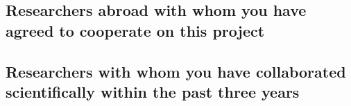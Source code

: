 \documentclass{scrartcl}
\begin{document}
\subsection{Researchers abroad with whom you have agreed to cooperate on this project}
\label{sec:collab:abroad}

%
%
%

\subsection{Researchers with whom you have collaborated scientifically within the past three years}
\end{document}
